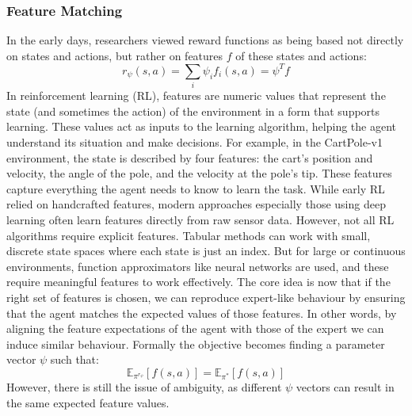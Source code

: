 \subsubsection{Feature Matching}
In the early days, researchers viewed reward functions as being based not directly on 
states and actions, but rather on features $f$ of these states and actions:
$$ r_{\psi}(s,a) = \sum_i \psi_i f_i(s,a) = \psi^T f$$
In reinforcement learning (RL), features are numeric values that represent the state 
(and sometimes the action) of the environment in a form that supports learning. These values
act as inputs to the learning algorithm, helping the agent understand its situation and make decisions.\newline
For example, in the CartPole-v1 environment, the state is described by four features: the cart’s position 
and velocity, the angle of the pole, and the velocity at the pole’s tip. These features capture everything 
the agent needs to know to learn the task. 
While early RL relied on handcrafted features, modern approaches especially those using deep learning often
learn features directly from raw sensor data. However, not all RL algorithms require explicit features. 
Tabular methods can work with small, discrete state spaces where each state is just an index. But for large
or continuous environments, function approximators like neural networks are used, and these require meaningful
features to work effectively.\newline
The core idea is now that if the right set of features is chosen, we can reproduce expert-like behaviour by ensuring
that the agent matches the expected values of those features. In other words, by aligning the feature expectations 
of the agent with those of the expert we can induce similar behaviour. Formally the objective becomes finding a parameter
vector $\psi$ such that:
$$\mathbb{E}_{\pi^{r_\psi}}[f(s,a)] = \mathbb{E}_{\pi^{*}}[f(s,a)]$$
However, there is still the issue of ambiguity, as different $\psi$ vectors can result in the same expected feature values.

